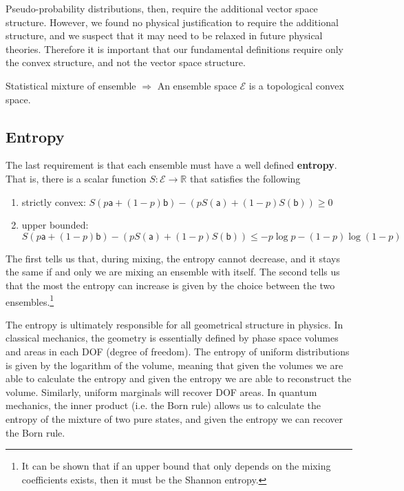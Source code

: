 \documentclass[10pt,twocolumn, nofootinbib]{revtex4-2}
\newcommand{\ens}[1][e] {\mathsf{#1}} %
\newcommand{\Ens}[1][E] {\mathcal{#1}} %
\begin{document}
Pseudo-probability distributions, then, require the additional vector space structure. However, we found no physical justification to require the additional structure, and we suspect that it may need to be relaxed in future physical theories.  Therefore it is important that our fundamental definitions require only the convex structure, and not the vector space structure.

\begin{tcolorbox}[colback=white, colframe=black]
	Statistical mixture of ensemble $\Rightarrow$ An ensemble space $\Ens$ is a topological convex space.
\end{tcolorbox}

\subsection{Entropy}
The last requirement is that each ensemble must have a well defined \textbf{entropy}. That is, there is a scalar function $S : \Ens \to \mathbb{R}$ that satisfies the following
\begin{enumerate}
	\item strictly convex: $S(p \ens[a] + (1-p) \ens[b]) - (p S(\ens[a]) + (1-p) S(\ens[b]) ) \geq 0$
	\item upper bounded: $S(p \ens[a] + (1-p) \ens[b]) - (p S(\ens[a]) + (1-p) S(\ens[b]) ) \leq - p \log p - (1-p) \log(1-p)$
\end{enumerate}
The first tells us that, during mixing, the entropy cannot decrease, and it stays the same if and only we are mixing an ensemble with itself. The second tells us that the most the entropy can increase is given by the choice between the two ensembles.\footnote{It can be shown that if an upper bound that only depends on the mixing coefficients exists, then it must be the Shannon entropy.}

The entropy is ultimately responsible for all geometrical structure in physics. In classical mechanics, the geometry is essentially defined by phase space volumes and areas in each DOF (degree of freedom). The entropy of uniform distributions is given by the logarithm of the volume, meaning that given the volumes we are able to calculate the entropy and given the entropy we are able to reconstruct the volume. Similarly, uniform marginals will recover DOF areas. In quantum mechanics, the inner product (i.e. the Born rule) allows us to calculate the entropy of the mixture of two pure states, and given the entropy we can recover the Born rule.
\end{document}
